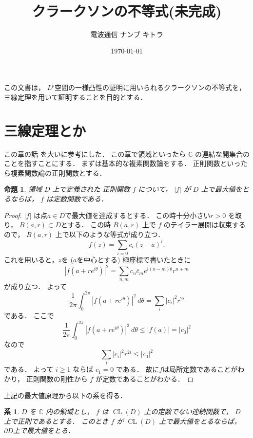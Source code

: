 \documentclass[leqno]{jsarticle}
\title{クラークソンの不等式(未完成)}
\author{電波通信 ナンブ キトラ }
\date{\today}
\newtheorem{prop}[thm]{命題}
\newtheorem{cor}[thm]{系}
\newcommand{\cc}{\mathbb{C}}
\DeclareMathOperator{\cl}{CL}
\begin{document}
\maketitle

この文書は，
$L^{p}$空間の一様凸性の証明に用いられるクラークソンの不等式を，
三線定理を用いて証明することを目的とする．


\section{三線定理とか}
この章の話
\cite{miya}を大いに参考にした．
この章で領域といったら
$\cc$
の連結な開集合のことを指すことにする．
まずは基本的な複素関数論をする．
正則関数といったら複素関数論の正則関数とする．
\begin{prop}
領域
$D$
上で定義された
正則関数
$f$
について，
$|f|$
が
$D$
上で最大値をとるならば，
$f$
は定数関数である．
\end{prop}
\begin{proof}
$|f|$ 
は点$a\in D$で最大値を達成するとする．
この時十分小さい$r>0$
を取り，
$B(a, r)\subset D$とする．
この時
$B(a,r)$
上で
$f$
のテイラー展開は収束するので，
$B(a,r)$
上で以下のような等式が成り立つ．
\[
f(z)=\sum_{i=0}c_i(z-a)^i. 
\]
これを用いると，$z$を
($a$を中心とする)
極座標で書いたときに
\[
|f(a+re^{i\theta})|^2=\sum_{n,m}c_n\bar{c}_me^{i(n-m)\theta}r^{n+m}
\]
が成り立つ．
よって
\[
\frac{1}{2\pi}\int_{0}^{2\pi}|f(a+re^{i\theta})|^2\ d\theta=\sum_{i}|c_i|^2r^{2i}
\]
である．
ここで
\[
\frac{1}{2\pi}\int_{0}^{2\pi}|f(a+re^{i\theta})|^2\ d\theta\le |f(a)|=|c_0|^2
\]
なので
\[
\sum_{i}|c_i|^2r^{2i}\le |c_0|^2
\]
である．
よって
$i\ge 1$
ならば
$c_{1}=0$
である．
故に$f$は局所定数であることがわかり，
正則関数の剛性から
$f$
が定数であることがわかる．
\end{proof}


上記の最大値原理から以下の系を得る．
\begin{cor}
$D$
を
$\cc$
内の領域とし，
$f$
は
$\cl(D)$
上の定数でない連続関数で，
$D$
上で正則であるとする．
このとき
$f$
が
$\cl(D)$
上で最大値をとるならば，
$\partial D$上で最大値をとる．
\end{cor}
\end{document}
